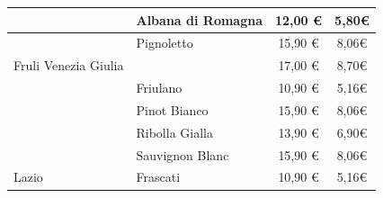 \documentclass[12pt, a4paper]{article}
\begin{document}
\begin{longtable}{@{}|l|l|c|c|}
                         & Albana di Romagna                                                         & 12,00 €                                                         & 5,80€                                                                                                         \\ \hline
                         & Pignoletto                                                                & 15,90 €                                                         & 8,06€                                                                                                         \\ \hline
    Fruli Venezia Giulia &                                                                           & 17,00 €                                                         & 8,70€                                                                                                         \\ \hline
                         & Friulano                                                                  & 10,90 €                                                          & 5,16€                                                                                                         \\ \hline
                         & Pinot Bianco                                                              & 15,90 €                                                         & 8,06€                                                                                                         \\ \hline
                         & Ribolla Gialla                                                            & 13,90 €                                                         & 6,90€                                                                                                         \\ \hline
                         & Sauvignon Blanc                                                           & 15,90 €                                                         & 8,06€                                                                                                         \\ \hline
    Lazio                & Frascati                                                                  & 10,90 €                                                          & 5,16€                                                                                                         \\ \hline

\end{longtable}
\end{document}
